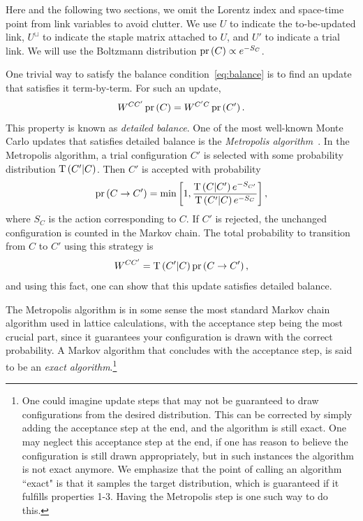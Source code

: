 Here and the following two sections,
we omit the Lorentz index and space-time point from link variables to
avoid clutter.  We use $U$ to indicate the to-be-updated link, 
$U^\sqcup$ to indicate the staple matrix attached to $U$, and
$U'$ to indicate a trial link. We will use the Boltzmann
distribution $\pr{C}\propto e^{-S_C}$.

One trivial way to satisfy the balance condition~\eqref{eq:balance} is
to find an update that satisfies it term-by-term. For such an update, 
\begin{equation}\label{eq:detailedbalance}\index{detailed balance}
    W^{CC'}\pr{C}=W^{C'C}\pr{C'}.
\end{equation}
This property is known as {\it detailed balance}.
One of the most well-known Monte Carlo updates that satisfies detailed
balance is the {\it Metropolis algorithm}~\cite{metropolis_equation_1953}. 
In the Metropolis algorithm, a trial configuration $C'$ is selected 
with some probability distribution $\operatorname{T}\left(C'|C\right)$. Then $C'$
is accepted with probability
\begin{equation}\label{eq:metupdate}
  \pr{C\to C'}=\min\left[1,\frac{\prt{C|C'}e^{-S_{C'}}}
    {\prt{C'|C}e^{-S_C}}\right],
\end{equation}
where $S_C$ is the action corresponding to $C$. 
If $C'$ is rejected, the unchanged configuration is counted
in the Markov chain. The total probability
to transition from $C$ to $C'$ using this strategy is 
\begin{equation}\label{eq:MCMCtransition}
W^{CC'}=\prt{C'|C}\pr{C\to C'}, 
\end{equation}
and using this fact, one
can show that this update satisfies detailed balance.

The Metropolis algorithm is in some sense the most standard Markov chain
algorithm used in lattice calculations, with the acceptance step
 being the most crucial part, since 
it guarantees your configuration is drawn with the correct probability.
A Markov algorithm that concludes with the acceptance step, is
said to be an {\it exact algorithm}.\footnote{One
could imagine update steps that may not be guaranteed to draw configurations
from the desired distribution. This can be corrected by simply adding
the acceptance step at the end, and the algorithm is still exact.
One may neglect this acceptance step at the end, if one has reason to
believe the configuration is still drawn appropriately, but in such
instances the algorithm is not exact anymore. We emphasize that the point
of calling an algorithm ``exact" is that it samples the target distribution,
which is guaranteed if it fulfills properties 1-3. Having the Metropolis
step is one such way to do this.} 

